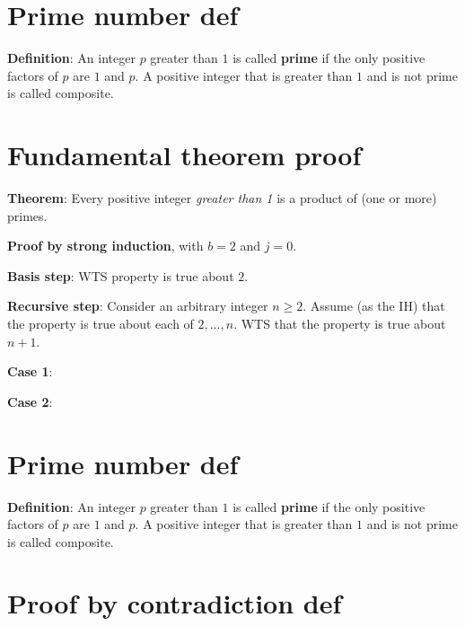 \documentclass[12pt, oneside]{article}
\begin{document}
    \vfill \vfill
\section*{Prime number def}


{\bf Definition}:  An integer $p$ greater than $1$ is called {\bf prime} if the only positive factors of 
$p$ are $1$ and $p$. A positive integer that is greater than $1$ and is not prime is called composite. 
 \vfill
\section*{Fundamental theorem proof}


{\bf Theorem}: Every positive integer {\it greater than 1} is a product of (one or more) primes.

{\bf Proof by strong induction}, with $b=2$ and $j=0$.

{\bf Basis step}:  WTS property is true about  $2$.
\vspace{20pt}

{\bf Recursive step}: Consider an arbitrary integer $n \geq 2$.
Assume (as the IH) that the property is true about  each of $2, \ldots, n$.  
WTS that the property is true about  $n+1$.


{\bf Case 1}: 


{\bf Case 2}: 

\vfill \vfill
\section*{Prime number def}


{\bf Definition}:  An integer $p$ greater than $1$ is called {\bf prime} if the only positive factors of 
$p$ are $1$ and $p$. A positive integer that is greater than $1$ and is not prime is called composite. 
 \vfill
\section*{Proof by contradiction def}


\end{document}

